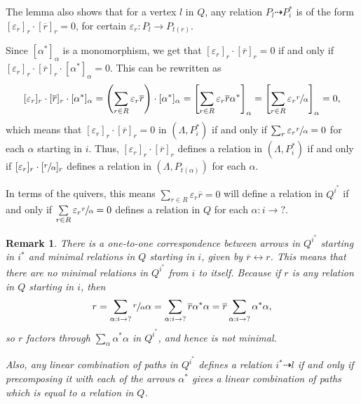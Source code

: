 \documentclass[12pt, dvipsnames, oneside]{amsart}
\newtheorem{remark}[theorem]{Remark}
\theoremstyle{definition}
\begin{document}
The lemma also shows that for a vertex $l$ in $Q$, any relation $P_l\dashrightarrow P_i^*$ is of the form $[\varepsilon_r]_r\cdot[\overline{r}]_r = 0$, for certain $\varepsilon_r\colon P_l\rightarrow P_{t(r)}$. 

Since $[\alpha^*]_\alpha$ is a monomorphism, we get that $[\varepsilon_r]_r\cdot[\overline{r}]_r = 0$ if and only if $[\varepsilon_r]_r\cdot[\overline{r}]_r\cdot[\alpha^*]_\alpha = 0$. This can be rewritten as
$$[\varepsilon_r]_r\cdot[\overline{r}]_r\cdot[\alpha^*]_\alpha = \left(\sum\limits_{r\in R} \varepsilon_r \overline{r} \right)\cdot [\alpha^*]_\alpha = \left[\sum\limits_{r\in R} \varepsilon_r \overline{r}\alpha^* \right]_\alpha = \left[\sum\limits_{r\in R} \varepsilon_r \sfrac{r}{\alpha} \right]_\alpha =0,$$
which means that $[\varepsilon_r]_r\cdot[\overline{r}]_r = 0$ in $(\Lambda, P_i^*)$ if and only if $\sum_r \varepsilon_r\sfrac{r}{\alpha}=0$ for each $\alpha$ starting in $i$. Thus, $[\varepsilon_r]_r\cdot[\overline{r}]_r$ defines a relation in $(\Lambda, P_i^*)$ if and only if $[\varepsilon_r]_r\cdot[\sfrac{r}{\alpha}]_r$ defines a relation in $(\Lambda, P_{t(\alpha)})$ for each $\alpha$. 

In terms of the quivers, this means $\sum\limits_{r\in R} \varepsilon_r \overline{r}=0$ will define a relation in $Q^{i^*}$ if and only if $\sum\limits_{r\in R} \varepsilon_r \sfrac{r}{\alpha} =0$ defines a relation in $Q$ for each $\alpha\colon i\rightarrow ?$.




\medskip




\begin{remark}\label{remark:outofi}
There is a one-to-one correspondence between arrows in $Q^{i^*}$ starting in $i^*$ and minimal relations in $Q$ starting in $i$, given by $\overline{r}\leftrightarrow r$. 
This means that there are no minimal relations in $Q^{i^*}$ from $i$ to itself. Because if $r$ is any relation in $Q$ starting in $i$, then 
$$r=\sum\limits_{\alpha:i\rightarrow ?} \sfrac{r}{\alpha} \alpha=\sum\limits_{\alpha:i\rightarrow ?}\overline{r}\alpha^*\alpha=\overline{r}\sum\limits_{\alpha:i\rightarrow ?} \alpha^*\alpha,$$
so $r$ factors through $\sum_\alpha \alpha^* \alpha$ in $Q^{i^*}$, and hence is not minimal.

Also, any linear combination of paths in $Q^{i^*}$ defines a relation $i^*\dashrightarrow l$ if and only if precomposing it with each of the arrows $\alpha^*$ gives a linear combination of paths which is equal to a relation in $Q$. 
\end{remark}
\end{document}
